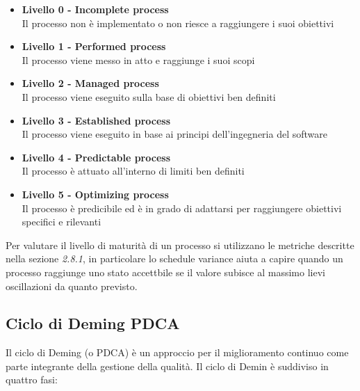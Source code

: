 {\begin{itemize}
  \item \textbf{Livello 0 - Incomplete process}\\
  Il processo non è implementato o non riesce a raggiungere i suoi obiettivi
  \item \textbf{Livello 1 - Performed process}\\
  Il processo viene messo in atto e raggiunge i suoi scopi
  \item  \textbf{Livello 2 - Managed process}\\
  Il processo viene eseguito sulla base di obiettivi ben definiti
  \item  \textbf{Livello 3 - Established process}\\
  Il processo viene eseguito in base ai principi dell’ingegneria del software
  \item  \textbf{Livello 4 - Predictable process}\\
  Il processo è attuato all’interno di limiti ben definiti
  \item  \textbf{Livello 5 - Optimizing process}\\
  Il processo è predicibile ed è in grado di adattarsi per raggiungere obiettivi specifici e rilevanti
\end{itemize}

Per valutare il livello di maturità di un processo si utilizzano le metriche descritte nella sezione \emph{2.8.1}, in particolare lo schedule variance aiuta a capire quando un processo raggiunge uno stato accettbile se il valore subisce al massimo lievi oscillazioni da quanto previsto.





\subsection{Ciclo di Deming PDCA}
Il ciclo di Deming (o PDCA) è un approccio per il miglioramento continuo come parte integrante della gestione della qualità.
Il ciclo di Demin è suddiviso in quattro fasi: \\




}
